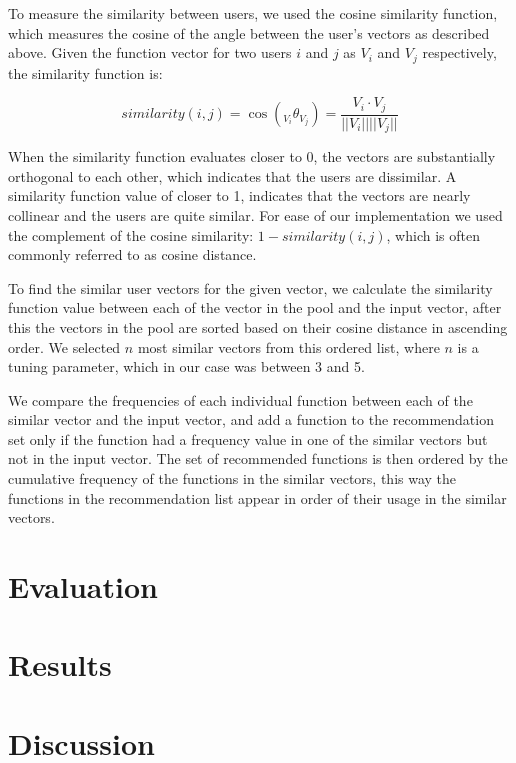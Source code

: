 \documentclass[conference]{IEEEtran}
\begin{document}
To measure the similarity between users, we used the cosine similarity function, which measures the cosine of the angle between the user's vectors as described above. Given the function vector for two users $i$ and $j$ as $V_i$ and $V_j$ respectively, the similarity function is:

\begin{center}
	\[
	similarity(i, j) = \cos({}_{V_i}\theta_{V_j}) = \frac{V_i \cdot V_j}{||V_i|| ||V_j||}
	\]
\end{center} 

When the similarity function evaluates closer to 0, the vectors are substantially orthogonal to each other, which indicates that the users are dissimilar. A similarity function value of closer to 1, indicates that the vectors are nearly collinear and the users are quite similar. For ease of our implementation we used the complement of the cosine similarity: $1 - similarity(i,j)$, which is often commonly referred to as cosine distance.

To find the similar user vectors for the given vector, we calculate the similarity function value between each of the vector in the pool and the input vector, after this the vectors in the pool are sorted based on their cosine distance in ascending order. We selected $n$ most similar vectors from this ordered list, where $n$ is a tuning parameter, which in our case was between 3 and 5.

We compare the frequencies of each individual function between each of the similar vector and the input vector, and add a function to the recommendation set only if the function had a frequency value in one of the similar vectors but not in the input vector. The set of recommended functions is then ordered by the cumulative frequency of the functions in the similar vectors, this way the functions in the recommendation list appear in order of their usage in the similar vectors.

\section{Evaluation}


\section{Results}

\section{Discussion}
\end{document}
